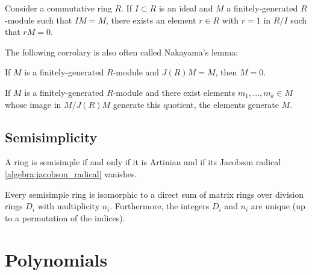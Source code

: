     \begin{theorem}\label{algebra:nakayama}
        Consider a commutative ring $R$. If $I\subset R$ is an ideal and $M$ a finitely-generated $R$-module such that $IM=M$, there exists an element $r\in R$ with $r=1$ in $R/I$ such that $rM=0$.
    \end{theorem}
    The following corrolary is also often called Nakayama's lemma:
    \begin{result}
        If $M$ is a finitely-generated $R$-module and $J(R)M=M$, then $M=0$.
    \end{result}
    \begin{result}
        If $M$ is a finitely-generated $R$-module and there exist elements $m_1,\ldots,m_k\in M$ whose image in $M/J(R)M$ generate this quotient, the elements generate $M$.
    \end{result}

\subsection{Semisimplicity}

    \begin{property}
        A ring is semisimple if and only if it is Artinian and if its Jacobson radical \ref{algebra:jacobson_radical} vanishes.
    \end{property}

    \begin{theorem}\label{algebra:artin_wedderburn}
        Every semisimple ring is isomorphic to a direct sum of matrix rings over division rings $D_i$ with multiplicity $n_i$. Furthermore, the integers $D_i$ and $n_i$ are unique (up to a permutation of the indices).
    \end{theorem}

\section{Polynomials}\label{section:algebraic_numbers}
